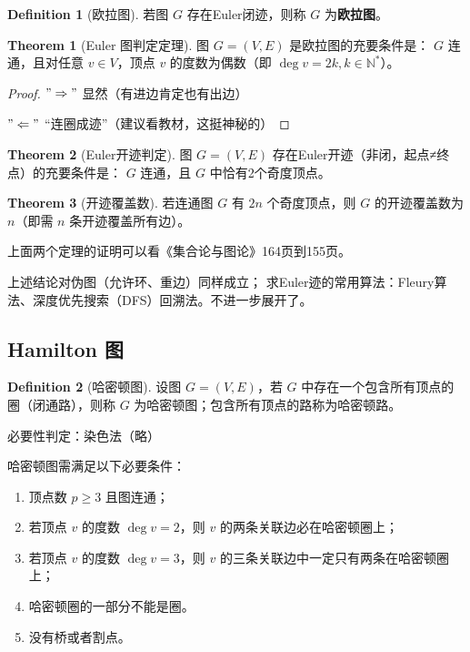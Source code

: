 \documentclass[oneside]{book}
\theoremstyle{definition}
\newtheorem{definition}{Definition}[section]
\newtheorem{theorem}{Theorem}[section]
\begin{document}
\begin{definition}[欧拉图]
	若图 \( G \) 存在Euler闭迹，则称 \( G \) 为\textbf{欧拉图}。
\end{definition}

\begin{theorem}[Euler 图判定定理]
	图 \( G = (V, E) \) 是欧拉图的充要条件是：
	\( G \) 连通，且对任意 \( v \in V \)，顶点 \( v \) 的度数为偶数（即 \( \deg v = 2k, k \in \mathbb{N}^* \)）。
\end{theorem}

\begin{proof}
	\("\Rightarrow"\) 显然（有进边肯定也有出边）
	
	\("\Leftarrow"\) “连圈成迹”（建议看教材，这挺神秘的）
\end{proof}
\begin{theorem}[Euler开迹判定]
	图 \( G = (V, E) \) 存在Euler开迹（非闭，起点≠终点）的充要条件是：
	\( G \) 连通，且 \( G \) 中恰有2个奇度顶点。
\end{theorem}

\begin{theorem}[开迹覆盖数]
	若连通图 \( G \) 有 \( 2n \) 个奇度顶点，则 \( G \) 的开迹覆盖数为 \( n \)（即需 \( n \) 条开迹覆盖所有边）。
\end{theorem}
上面两个定理的证明可以看《集合论与图论》164页到155页。


上述结论对伪图（允许环、重边）同样成立；
求Euler迹的常用算法：Fleury算法、深度优先搜索（DFS）回溯法。不进一步展开了。


\subsection{Hamilton 图}
\begin{definition}[哈密顿图]
	设图 \( G = (V, E) \)，若 \( G \) 中存在一个包含所有顶点的圈（闭通路），则称 \( G \) 为哈密顿图；包含所有顶点的路称为哈密顿路。
\end{definition}
必要性判定：染色法（略）

哈密顿图需满足以下必要条件：
\begin{enumerate}
	\item 顶点数 \( p \geq 3 \) 且图连通；
	\item 若顶点 \( v \) 的度数 \( \deg v = 2 \)，则 \( v \) 的两条关联边必在哈密顿圈上；
	\item 若顶点 \( v \) 的度数 \( \deg v = 3 \)，则 \( v \) 的三条关联边中一定只有两条在哈密顿圈上；
	\item 哈密顿圈的一部分不能是圈。
	\item 没有桥或者割点。
\end{enumerate}
\end{document}
